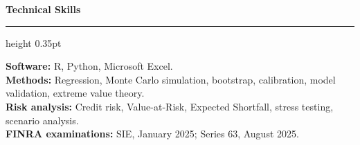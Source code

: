 \documentclass[11pt,letterpaper]{article}
\newcommand{\cvsection}[1]{%
  \par\addvspace{4pt}
  {\large\bfseries #1}\par
  \nobreak\vspace{1pt}
  \hrule height 0.35pt
  \nobreak\vspace{3pt}
}
\begin{document}

\cvsection{Technical Skills}

\textbf{Software:}
R, Python, Microsoft Excel.\\
\textbf{Methods:}
Regression, Monte Carlo simulation, bootstrap,
calibration, model validation, extreme value theory.\\
\textbf{Risk analysis:}
Credit risk, Value-at-Risk, Expected Shortfall,
stress testing, scenario analysis.\\
\textbf{FINRA examinations:}
SIE, January 2025; Series 63, August 2025.
\end{document}
